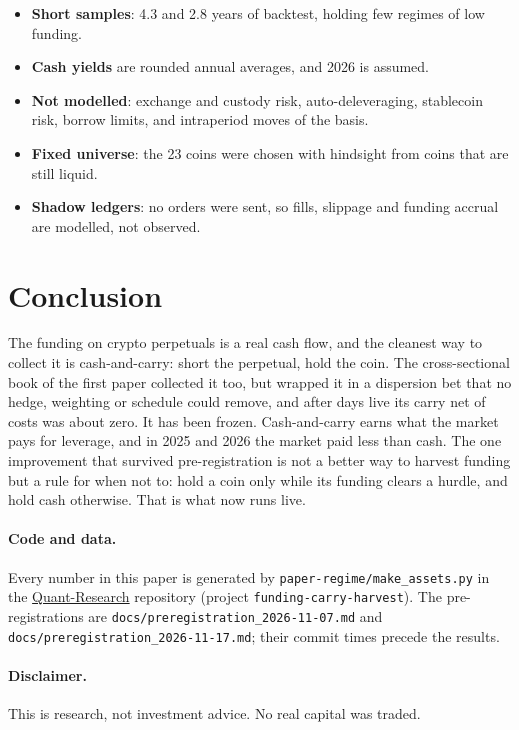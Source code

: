 \documentclass[11pt,a4paper]{article}
\begin{document}
\begin{itemize}
  \item \textbf{Short samples}: 4.3 and 2.8 years of backtest, holding few regimes of
  low funding.
  \item \textbf{Cash yields} are rounded annual averages, and 2026 is assumed.
  \item \textbf{Not modelled}: exchange and custody risk, auto-deleveraging,
  stablecoin risk, borrow limits, and intraperiod moves of the basis.
  \item \textbf{Fixed universe}: the 23 coins were chosen with hindsight from coins
  that are still liquid.
  \item \textbf{Shadow ledgers}: no orders were sent, so fills, slippage and funding
  accrual are modelled, not observed.
\end{itemize}

\section{Conclusion}

The funding on crypto perpetuals is a real cash flow, and the cleanest way to collect
it is cash-and-carry: short the perpetual, hold the coin. The cross-sectional book of
the first paper collected it too, but wrapped it in a dispersion bet that no hedge,
weighting or schedule could remove, and after \LiveDays{} days live its carry net of
costs was about zero. It has been frozen. Cash-and-carry earns what the market pays for
leverage, and in 2025 and 2026 the market paid less than cash. The one improvement
that survived pre-registration is not a better way to harvest funding but a rule for
when not to: hold a coin only while its funding clears a hurdle, and hold cash
otherwise. That is what now runs live.

\paragraph{Code and data.} Every number in this paper is generated by
\texttt{paper-regime/make\_assets.py} in the
\href{https://github.com/noaRoblesLevy/Quant-Research}{Quant-Research} repository
(project \texttt{funding-carry-harvest}). The pre-registrations are
\texttt{docs/preregistration\_2026-11-07.md} and
\texttt{docs/preregistration\_2026-11-17.md}; their commit times precede the results.

\paragraph{Disclaimer.} This is research, not investment advice. No real capital was
traded.
\end{document}
